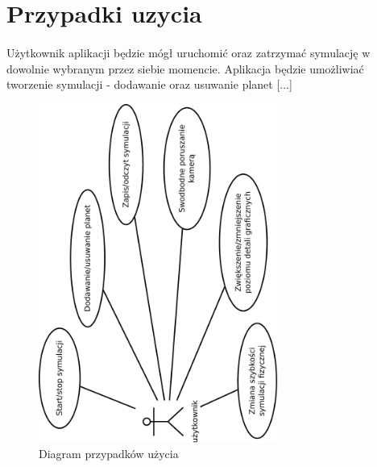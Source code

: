 \section{Przypadki uzycia}\label{sec:usecase}

\paragraph{}

Użytkownik aplikacji będzie mógł uruchomić oraz zatrzymać symulację w dowolnie wybranym przez siebie momencie. Aplikacja będzie umożliwiać tworzenie symulacji - dodawanie oraz usuwanie planet [...]

\begin{figure}[h]
	\centering
	\includegraphics[width=0.7\textwidth,angle=-90]{use-case.pdf}
	\caption{Diagram przypadków użycia}
	\label{fig:use-case}
\end{figure}

